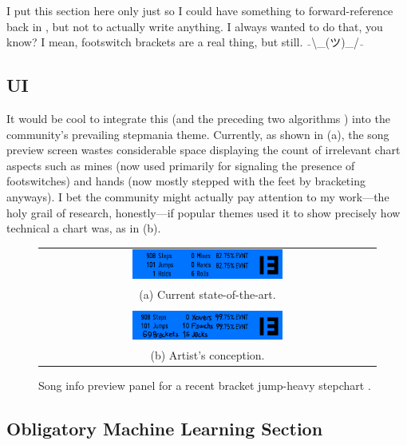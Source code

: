 \documentclass[10pt]{sigplanconf}
\begin{document}
I put this section here only just so I could have something to forward-reference back in ,
but not to actually write anything.
I always wanted to do that, you know?
I mean, footswitch brackets are %
a real thing, but still. $\bar{~~}$\textbackslash\_(ツ)\_/$\bar{~~}$

\subsection{UI}

It would be cool to integrate this (and the preceding two algorithms \cite{turniness,crossoveriness})
into
the community's prevailing stepmania theme.
Currently, as shown in (a),
the song preview screen wastes considerable space displaying the count of irrelevant chart aspects
such as mines (now used primarily for signaling the presence of footswitches)
and hands (now mostly stepped with the feet by bracketing anyways).
I bet the community might actually pay attention to my work---the holy grail of research, honestly---if
popular themes used it to show precisely how technical a chart was, as in (b).

\begin{figure}[t]
	\begin{tabular}{c}
	\includegraphics[width=0.46\textwidth]{song-info.png} \\
		(a) Current state-of-the-art.
		\\
		\\
	\includegraphics[width=0.46\textwidth]{song-info-better.png} \\
		(b) Artist's conception.
	\end{tabular}
	\caption{Song info preview panel for a recent bracket jump-heavy stepchart \cite{divine}.}
	\label{fig:songpreview}
\end{figure}

\subsection{Obligatory Machine Learning Section}
\end{document}
